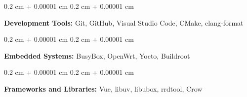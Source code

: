 \documentclass[10pt, letterpaper]{article}
\newenvironment{onecolentry}{
    \begin{adjustwidth}{
        0.2 cm + 0.00001 cm
    }{
        0.2 cm + 0.00001 cm
    }
}{
    \end{adjustwidth}
} %
\begin{document}
        \begin{onecolentry}
            \textbf{Development Tools:} Git, GitHub, Visual Studio Code, CMake, clang-format
        \end{onecolentry}

        \vspace{0.2 cm}

        \begin{onecolentry}
            \textbf{Embedded Systems:} BusyBox, OpenWrt, Yocto, Buildroot
        \end{onecolentry}

        \vspace{0.2 cm}

        \begin{onecolentry}
            \textbf{Frameworks and Libraries:} Vue, libuv, libubox, rrdtool, Crow
        \end{onecolentry}


    
\end{document}
